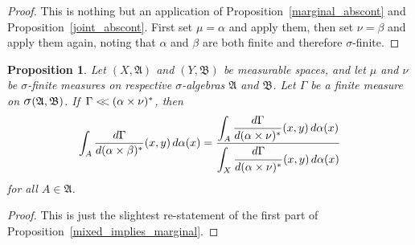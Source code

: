 \documentclass[
twoside=true,
paper=letter,
fontsize=9pt,
pagesize=auto,
leqno,
openany,
headsepline,
overfullrule,
]{scrbook}
\theoremstyle{plain}
\theoremstyle{plain}
\newtheorem{prop}[thm]{Proposition}
\theoremstyle{definition}
\theoremstyle{bfnoteitalic}
\theoremstyle{bfnoteroman}
\newcommand{\sigalg}[1]{\mathfrak{#1}}
\newcommand{\sagb}{\mathop{\hbox{\large{$\sigma$}}}\nolimits}
\newcommand{\textsigma}{\hbox{\large{$\sigma$}}\kern-1pt}
\newcommand{\sigmaalgebra}{\sigalg{A}}
\newcommand{\sigmaalgebraii}{\sigalg{B}}
\newcommand{\productsig}[2]{\sagb(#1,#2)}
\newcommand{\lilstrut}{\vphantom{\bigl(}}
\newcommand{\measurespace}{X}
\newcommand{\measurespaceii}{Y}
\newcommand{\mspaceelt}{x}
\newcommand{\mspaceeltii}{y}
\newcommand{\abscont}{\mathrel{< \kern-3.5pt <}}
\newcommand{\measure}{\mu}
\newcommand{\measmu}{\mu}
\newcommand{\measureii}{\nu}
\newcommand{\measnu}{\nu}
\newcommand{\seti}{A}
\newcommand{\measonprod}{\Gamma}%
\newcommand{\marginalone}{\alpha}%
\newcommand{\marginaltwo}{\beta}%
\begin{document}
\begin{proof}
This is nothing but an application of Proposition~\ref{marginal_abscont} and Proposition~\ref{joint_abscont}. First set $\measmu=\marginalone$ and apply them, then set $\measnu=\marginaltwo$ and apply them again, noting that $\marginalone$ and $\marginaltwo$ are both finite and therefore \textsigma\hyp{}finite.
\end{proof}


\begin{prop}
Let
$(\measurespace, \sigmaalgebra)$
and
$(\measurespaceii, \sigmaalgebraii)$
be measurable spaces, and let $\measure$ and $\measureii$
be \textsigma-finite measures on  respective \textsigma-algebras
$\sigmaalgebra$ and $\sigmaalgebraii$.
Let $\measonprod$ be a finite measure on
$\productsig{\sigmaalgebra}{\sigmaalgebraii}$.
If\,
$\measonprod \abscont (\marginalone\times\measnu)^*$, then
\[
\int_\seti
\frac{d\measonprod}{d(\marginalone\times\marginaltwo)^*}
(\mspaceelt,\mspaceeltii)\,d\marginalone(\mspaceelt)
=
\frac{\displaystyle
\int_\seti
\dfrac{d\measonprod}{d(\marginalone\times\measnu)^*}(\mspaceelt,\mspaceeltii)
\,d\marginalone(\mspaceelt)
}
{\displaystyle
\int_\measurespace
\dfrac{d\measonprod\lilstrut}{d(\marginalone\times\measnu)^*}(\mspaceelt,\mspaceeltii)
\,d\marginalone(\mspaceelt)
}
\]
for all $\seti\in\sigmaalgebra$.
\end{prop}


\begin{proof}
This is just the slightest re-statement of the first part of Proposition~\ref{mixed_implies_marginal}.
\end{proof}
\end{document}
